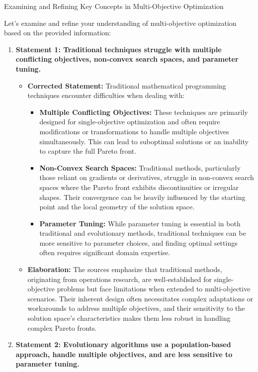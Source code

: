 \documentclass[
]{article}
\author{}
\date{}
\begin{document}
{Examining and Refining Key Concepts in Multi-Objective
Optimization}\label{examining-and-refining-key-concepts-in-multi-objective-optimization}

Let's examine and refine your understanding of multi-objective
optimization based on the provided information:

\begin{enumerate}
\def\labelenumi{\arabic{enumi}.}
\item
  \textbf{Statement 1: Traditional techniques struggle with multiple
  conflicting objectives, non-convex search spaces, and parameter
  tuning.}

  \begin{itemize}
  
  \item
    \textbf{Corrected Statement:} Traditional mathematical programming
    techniques encounter difficulties when dealing with:

    \begin{itemize}
    
    \item
      \textbf{Multiple Conflicting Objectives:} These techniques are
      primarily designed for single-objective optimization and often
      require modifications or transformations to handle multiple
      objectives simultaneously. This can lead to suboptimal solutions
      or an inability to capture the full Pareto front.
    \item
      \textbf{Non-Convex Search Spaces:} Traditional methods,
      particularly those reliant on gradients or derivatives, struggle
      in non-convex search spaces where the Pareto front exhibits
      discontinuities or irregular shapes. Their convergence can be
      heavily influenced by the starting point and the local geometry of
      the solution space.
    \item
      \textbf{Parameter Tuning:} While parameter tuning is essential in
      both traditional and evolutionary methods, traditional techniques
      can be more sensitive to parameter choices, and finding optimal
      settings often requires significant domain expertise.
    \end{itemize}
  \item
    \textbf{Elaboration:} The sources emphasize that traditional
    methods, originating from operations research, are well-established
    for single-objective problems but face limitations when extended to
    multi-objective scenarios. Their inherent design often necessitates
    complex adaptations or workarounds to address multiple objectives,
    and their sensitivity to the solution space's characteristics makes
    them less robust in handling complex Pareto fronts.
  \end{itemize}
\item
  \textbf{Statement 2: Evolutionary algorithms use a population-based
  approach, handle multiple objectives, and are less sensitive to
  parameter tuning.}


\end{enumerate}
\end{document}
